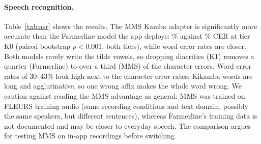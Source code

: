 \documentclass[11pt]{article}
\begin{document}
\begin{table}[t]
\centering\small
{}
\caption{Speech recognition on FLEURS \texttt{kam\_ke} test (827 utterances), greedy CTC, corpus-level with 95\% bootstrap intervals.}
\label{tab:asr}
\end{table}

\paragraph{Speech recognition.} Table~\ref{tab:asr} shows the results. The MMS Kamba adapter is significantly more accurate than the Farmerline model the app deploys: \asrMmsCER{}\% against \asrFarmerlineCER{}\% CER at tier K0 (paired bootstrap $p<0.001$, both tiers), while word error rates are closer. Both models rarely write the tilde vowels, so dropping diacritics (K1) removes a quarter (Farmerline) to over a third (MMS) of the character errors. Word error rates of 30--43\% look high next to the character error rates; Kikamba words are long and agglutinative, so one wrong affix makes the whole word wrong. We caution against reading the MMS advantage as general: MMS was trained on FLEURS training audio (same recording conditions and text domain, possibly the same speakers, but different sentences), whereas Farmerline's training data is not documented and may be closer to everyday speech. The comparison argues for testing MMS on in-app recordings before switching.

\begin{table}[t]
\centering\small
{}
\caption{Voice intelligibility by ASR round trip on 100 FLEURS-test sentences, transcribed by the deployed ASR model, with 95\% bootstrap intervals. Lower is better; real speech is the reference point. $^\dagger$: CER significantly lower than the Swahili voice (paired bootstrap, one-sided $p<0.05$).}
\label{tab:tts}
\end{table}
\end{document}
